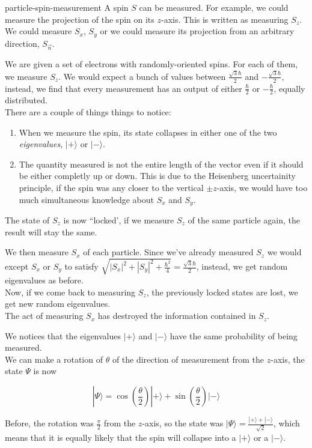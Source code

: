 \documentclass[preview]{standalone}
\begin{document}
\begin{snippet}{particle-spin-measurement}
    A spin \(S\) can be measured. For example, we could measure the projection of the spin on its \(z\)-axis.
    This is written as measuring \(S_z\). We could measure \(S_x\), \(S_y\) or we could measure its projection from an arbitrary direction, \(S_{\vec{n}}\).

    We are given a set of electrons with randomly-oriented spins. For each of them, we measure \(S_z\).
    We would expect a bunch of values between \(\frac{\sqrt{3}\hbar}{2}\) and \(-\frac{\sqrt{3}\hbar}{2}\),
    instead, we find that every measurement has an output of either \(\frac{\hbar}{2}\) or \(-\frac{\hbar}{2}\), equally distributed. \\
    There are a couple of things things to notice:

    \begin{enumerate}
        \item When we measure the spin, its state collapses in either one of the two \textit{eigenvalues}, \(|+\rangle\) or \(|-\rangle\).
        \item The quantity measured is not the entire length of the vector even if it should be either completly up or down.
            This is due to the Heisenberg uncertainity principle, if the spin was any closer to the vertical \(\pm z\)-axis,
            we would have too much simultaneous knowledge about \(S_x\) and \(S_y\).
    \end{enumerate}

    The state of \(S_z\) is now ``locked', if we measure \(S_z\) of the same particle again, the result will stay the same.

    We then measure \(S_x\) of each particle. Since we've already measured \(S_z\) we would except \(S_x\) or \(S_y\)
    to satisfy \(\sqrt{{|S_x|}^2 + {|S_y|}^2 + \frac{\hbar^2}{4}} = \frac{\sqrt{3}\hbar}{2}\), instead, we get random eigenvalues as before. \\
    Now, if we come back to measuring \(S_z\), the previously locked states are lost, we get new random eigenvalues. \\
    The act of measuring \(S_x\) has destroyed the information contained in \(S_z\).

    We notices that the eigenvalues \(|+\rangle\) and \(|-\rangle\) have the same probability of being measured. \\
    We can make a rotation of \(\theta\) of the direction of measurement from the \(z\)-axis, the state \(\Psi\) is now

    \[
        |\Psi\rangle = \cos\left(\frac{\theta}{2}\right) |+\rangle + \sin\left(\frac{\theta}{2}\right)|-\rangle
    \]

    Before, the rotation was \(\frac{\pi}{2}\) from the \(z\)-axis, so the state was \(|\Psi\rangle=\frac{|+\rangle + |-\rangle}{\sqrt{2}}\),
    which means that it is equally likely that the spin will collapse into a \(|+\rangle\) or a \(|-\rangle\).
\end{snippet}
\end{document}
